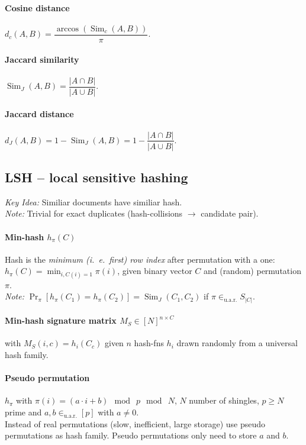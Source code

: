 \documentclass[a4paper, 9pt, DIV=24]{scrartcl}
\DeclareMathOperator{\Sim}{Sim}
\newcommand{\inuar}{\in_{\text{u.a.r.}}}
\begin{document}
\begin{twocolumn}
\paragraph{Cosine distance} $d_c(A,B) = \dfrac{\arccos(\Sim_c(A,B))}{\pi}.$
\paragraph{Jaccard similarity} $\Sim_J(A,B) = \dfrac{|A \cap B|}{|A \cup B|}.$ 
\paragraph{Jaccard distance}
$ d_J(A,B) = 1 - \Sim_J(A,B) = 1 - \dfrac{|A \cap B|}{|A \cup B|}.$

\subsection{LSH -- local sensitive hashing}
\emph{Key Idea:} Similiar documents have similiar hash. \\
\emph{Note:} Trivial for exact duplicates (hash-collisions $\rightarrow$ candidate pair).\\
\paragraph{Min-hash $h_\pi(C)$}
Hash is the \emph{minimum (i.\ e.\ first) row index} after permutation with a one: $h_\pi(C) = \min_{i, C(i) = 1} \pi(i)$,
given binary vector $C$ and (random) permutation $\pi$. \\
\emph{Note:} $\Pr_\pi[h_\pi(C_1) = h_\pi(C_2)] = \Sim_J(C_1,C_2)$ if $\pi \inuar S_{|C|}$.
\paragraph{Min-hash signature matrix $M_S \in [N]^{n\times C}$}
with $M_S(i,c) = h_i(C_c)$
given $n$ hash-fns $h_i$ drawn randomly from a universal hash family.

\paragraph{Pseudo permutation}
$h_\pi$ with $\pi(i) = (a\cdot i + b) \mod\ p \mod\ N$, $N$ number of shingles, $p\geq N$ prime and $a,b \inuar [p]$ with $a \neq 0$. \\
Instead of real permutations (slow, inefficient, large storage) use pseudo permutations as hash family. Pseudo permutations only need to store $a$ and $b$.


\end{twocolumn}
\end{document}
